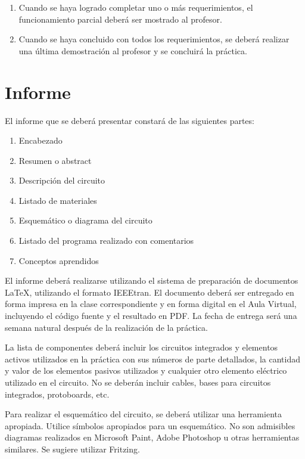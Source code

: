 \documentclass[12pt,letterpaper]{IEEEtran}
\begin{document}
\begin{enumerate}[resume]
	\item Cuando se haya logrado completar uno o más requerimientos, el funcionamiento parcial deberá ser mostrado al profesor.
	\item Cuando se haya concluido con todos los requerimientos, se deberá realizar una última demostración al profesor y se concluirá la práctica.
\end{enumerate}


\section{Informe}

El informe que se deberá presentar constará de las siguientes partes:

\begin{enumerate}
  \item Encabezado
  \item Resumen o abstract
  \item Descripción del circuito
  \item Listado de materiales
  \item Esquemático o diagrama del circuito
  \item Listado del programa realizado con comentarios
  \item Conceptos aprendidos
\end{enumerate}

El informe deberá realizarse utilizando el sistema de preparación de documentos \LaTeX, utilizando el formato IEEEtran. El documento deberá ser entregado en forma impresa en la clase correspondiente y en forma digital en el Aula Virtual, incluyendo el código fuente y el resultado en PDF.  La fecha de entrega será una semana natural después de la realización de la práctica.

La lista de componentes deberá incluir los circuitos integrados y elementos activos utilizados en la práctica con sus números de parte detallados, la cantidad y valor de los elementos pasivos utilizados y cualquier otro elemento eléctrico utilizado en el circuito. No se deberán incluir cables, bases para circuitos integrados, protoboards, etc.

Para realizar el esquemático del circuito, se deberá utilizar una herramienta apropiada. Utilice símbolos apropiados para un esquemático. No son admisibles diagramas realizados en Microsoft Paint, Adobe Photoshop u otras herramientas similares. Se sugiere utilizar Fritzing.
\end{document}
